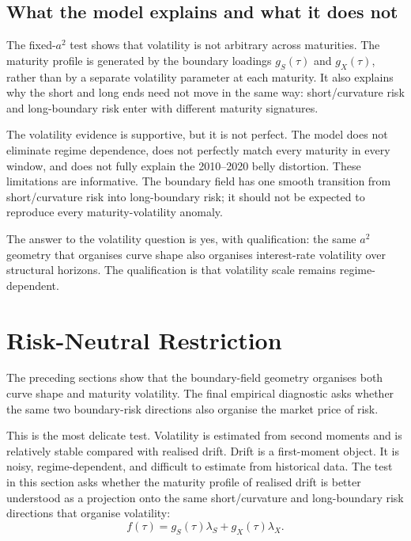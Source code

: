 \documentclass[11pt]{article}
\begin{document}
\subsection{What the model explains and what it does not}

The fixed-$a^2$ test shows that volatility is not arbitrary across maturities. The maturity profile is generated by the boundary loadings $g_S(\tau)$ and $g_X(\tau)$, rather than by a separate volatility parameter at each maturity. It also explains why the short and long ends need not move in the same way: short/curvature risk and long-boundary risk enter with different maturity signatures.

The volatility evidence is supportive, but it is not perfect. The model does not eliminate regime dependence, does not perfectly match every maturity in every window, and does not fully explain the 2010--2020 belly distortion. These limitations are informative. The boundary field has one smooth transition from short/curvature risk into long-boundary risk; it should not be expected to reproduce every maturity-volatility anomaly.

The answer to the volatility question is yes, with qualification: the same $a^2$ geometry that organises curve shape also organises interest-rate volatility over structural horizons. The qualification is that volatility scale remains regime-dependent.

\section{Risk-Neutral Restriction}

The preceding sections show that the boundary-field geometry organises both curve shape and maturity volatility. The final empirical diagnostic asks whether the same two boundary-risk directions also organise the market price of risk.

This is the most delicate test. Volatility is estimated from second moments and is relatively stable compared with realised drift. Drift is a first-moment object. It is noisy, regime-dependent, and difficult to estimate from historical data. The test in this section asks whether the maturity profile of realised drift is better understood as a projection onto the same short/curvature and long-boundary risk directions that organise volatility:
\begin{equation}
  f(\tau)=g_S(\tau)\lambda_S+g_X(\tau)\lambda_X.
\end{equation}
\end{document}

